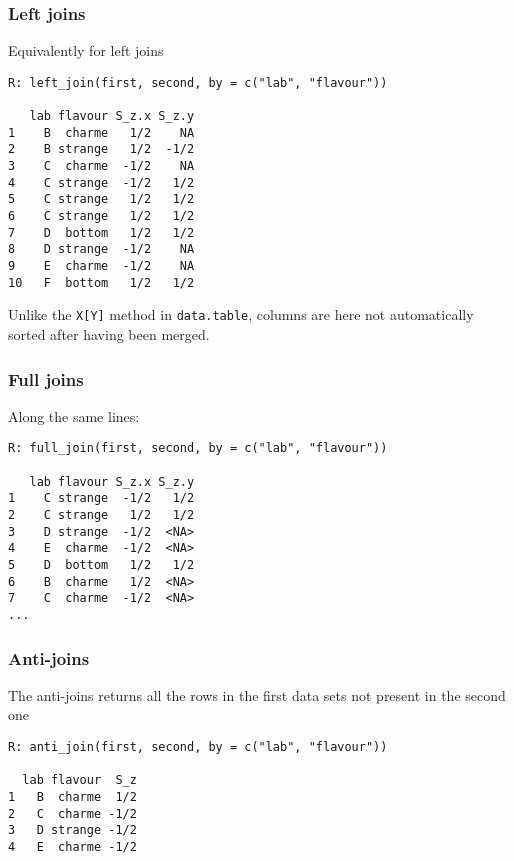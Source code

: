 \subsubsection*{Left joins}
Equivalently for left joins
\begin{verbatim}
R: left_join(first, second, by = c("lab", "flavour")) 

   lab flavour S_z.x S_z.y
1    B  charme   1/2    NA
2    B strange   1/2  -1/2
3    C  charme  -1/2    NA
4    C strange  -1/2   1/2
5    C strange   1/2   1/2
6    C strange   1/2   1/2
7    D  bottom   1/2   1/2
8    D strange  -1/2    NA
9    E  charme  -1/2    NA
10   F  bottom   1/2   1/2 
\end{verbatim}
Unlike the \texttt{X[Y]} method in \texttt{data.table},
columns are here not automatically sorted after 
having been merged.

\subsubsection*{Full joins}
Along the same lines:
\begin{verbatim}
R: full_join(first, second, by = c("lab", "flavour"))

   lab flavour S_z.x S_z.y
1    C strange  -1/2   1/2
2    C strange   1/2   1/2
3    D strange  -1/2  <NA>
4    E  charme  -1/2  <NA>
5    D  bottom   1/2   1/2
6    B  charme   1/2  <NA>
7    C  charme  -1/2  <NA>
...
\end{verbatim}

\subsubsection*{Anti-joins}
The anti-joins returns all the rows in the first
data sets not present in the second one
\begin{verbatim}
R: anti_join(first, second, by = c("lab", "flavour"))

  lab flavour  S_z
1   B  charme  1/2
2   C  charme -1/2
3   D strange -1/2
4   E  charme -1/2
\end{verbatim}


